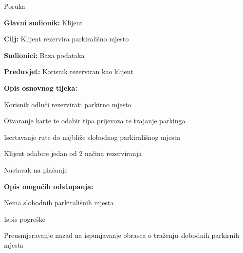 \begin{packed_item}
\begin{packed_item}
\begin{packed_item}
\begin{packed_enum}
    							\item Poruka 
    							
    						\end{packed_enum}
    						
    					\end{packed_item}
    				\end{packed_item}
    				\noindent {}
    				\begin{packed_item}
    					
    					\item \textbf{Glavni sudionik: } Klijent
    					\item  \textbf{Cilj:} Klijent rezervira parkirališno mjesto
    					\item  \textbf{Sudionici:} Baza podataka
    					\item  \textbf{Preduvjet:} Korisnik rezerviran kao klijent
    					\item  \textbf{Opis osnovnog tijeka:}
    					
    					\item[] \begin{packed_enum}
    						
    						\item Korisnik odluči rezervirati parkirno mjesto
    						\item Otvaranje karte te odabir tipa prijevoza te trajanje parkinga	
    						\item Iscrtavanje rute do najbliže slobodnog parkirališnog mjesta
    						\item Klijent odabire jedan od 2 načina rezerviranja
    						\item Nastavak na plaćanje
    					\end{packed_enum}
    					
    					\item  \textbf{Opis mogućih odstupanja:}
    					
    					\item[] \begin{packed_item}
    						
    						\item[3.a] Nema slobodnih parkirališnih mjesta
    						\item[] \begin{packed_enum}
    							
    							\item Ispis pogreške
    							\item Preusmjeravanje nazad na ispunjavanje obrasca o traženju slobodnih parkirnih mjesta
    							

\end{packed_enum}
\end{packed_item}
\end{packed_item}
\end{packed_item}

